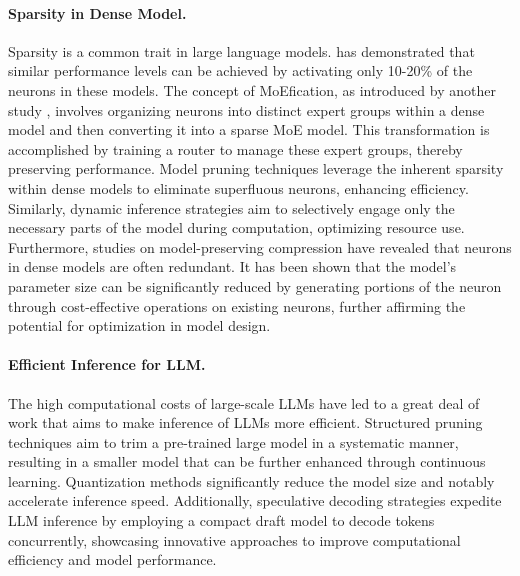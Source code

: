 \paragraph{Sparsity in Dense Model.}Sparsity is a common trait in large language models. \cite{liu2023deja} has demonstrated that similar performance levels can be achieved by activating only 10-20\% of the neurons in these models. The concept of MoEfication, as introduced by another study \cite{zhang2021moefication}, involves organizing neurons into distinct expert groups within a dense model and then converting it into a sparse MoE model. This transformation is accomplished by training a router to manage these expert groups, thereby preserving performance. Model pruning techniques \cite{voita2019analyzing,michel2019sixteen} leverage the inherent sparsity within dense models to eliminate superfluous neurons, enhancing efficiency. Similarly, dynamic inference strategies \cite{wang2018skipnet,wu2018blockdrop,pan2021va} aim to selectively engage only the necessary parts of the model during computation, optimizing resource use. Furthermore, studies on model-preserving compression \cite{chee2022model} have revealed that neurons in dense models are often redundant. It has been shown that the model's parameter size can be significantly reduced by generating portions of the neuron through cost-effective operations on existing neurons, further affirming the potential for optimization in model design.

\paragraph{Efficient Inference for LLM.} The high computational costs of large-scale LLMs have led to a great deal of work that aims to make inference of LLMs more efficient. Structured pruning techniques \cite{xia2023sheared,xia2022structured,cai2019once,wen2016learning,liu2017learning,luo2017thinet} aim to trim a pre-trained large model in a systematic manner, resulting in a smaller model that can be further enhanced through continuous learning. Quantization methods \cite{xiao2023smoothquant,nagel2019data,nagel2020up,wang2019haq,lin2023awq,frantar2022gptq} significantly reduce the model size and notably accelerate inference speed. Additionally, speculative decoding strategies \cite{stern2018blockwise,chen2023accelerating,leviathan2023fast} expedite LLM inference by employing a compact draft model to decode tokens concurrently, showcasing innovative approaches to improve computational efficiency and model performance.
\vspace{-2mm}

